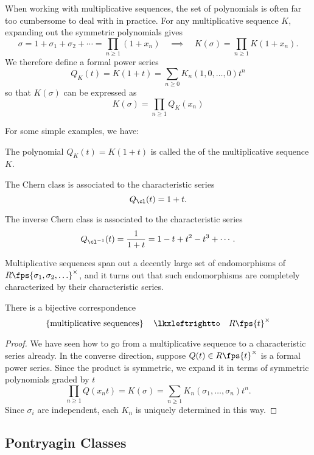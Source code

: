 When working with multiplicative sequences, the set of polynomials is often far too cumbersome to deal with in practice. For any multiplicative sequence $K$,
expanding out the symmetric polynomials gives
\[
	\sigma = 1+\sigma_1+\sigma_2+\cdots = \prod_{n\geq 1}(1+x_n)
	\quad\implies\quad
	K(\sigma) = \prod_{n\geq 1} K(1+x_n).
\]
We therefore define a formal power series
\[
		Q_K(t) = K(1+t)=\sum_{n\geq 0}K_n(1,0,\ldots, 0) t^n
\]
so that $K(\sigma)$ can be expressed as
\[
		K(\sigma) = \prod_{n\geq 1}Q_K(x_n)
\]

For some simple examples, we have:

\begin{definition}
	The polynomial $Q_K(t)=K(1+t)$ is called the  of the multiplicative sequence $K$.
\end{definition}

\begin{example}
	The Chern class is associated to the characteristic series
	\[Q_\cl(t)=1+t.\]
\end{example}

\begin{example}
	The  inverse Chern class is associated to the characteristic series
	\[Q_{\cl^{-1}}(t)=\frac{1}{1+t}=1-t+t^2-t^3+\cdots.\]
\end{example}

Multiplicative sequences span out a decently large set of endomorphisms of $R\fps{\sigma_1,\sigma_2,\ldots}^\times$, and it turns out that such endomorphisms are completely characterized by their characteristic series.

\begin{theorem}
	There is a bijective correspondence
	\[
		\left\{\parbox{10.5em}{multiplicative sequences}\right\} \quad\lkxleftrightto\quad R\fps{t}^\times
	\]
\end{theorem}
\begin{proof}
	We have seen how to go from a multiplicative sequence to a characteristic series already. In the converse direction, suppose $Q(t)\in R\fps{t}^\times$ is a formal power series. Since the product is symmetric, we expand it in terms of symmetric polynomials graded by $t$
	\[
		 \prod_{n\geq 1} Q(x_n t) = K(\sigma)= \sum_{n\geq 1}K_n(\sigma_1,\ldots, \sigma_n) t^n.
	\]
	Since $\sigma_i$ are independent, each $K_n$ is uniquely determined in this way.
\end{proof}

\subsection{Pontryagin Classes}

